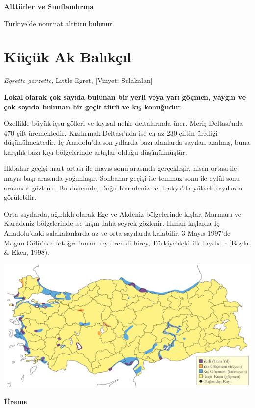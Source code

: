 \documentclass[
  a4paper,
  DIV=11,
  numbers=noendperiod]{scrreprt}
\begin{document}
\textbf{Alttürler ve Sınıflandırma}

Türkiye'de nominat alttürü bulunur.

\section{Küçük Ak Balıkçıl}\label{kuxfcuxe7uxfck-ak-balux131kuxe7ux131l}

\emph{Egretta garzetta}, Little Egret, {[}Vinyet: Sulakalan{]}

\textbf{Lokal olarak çok sayıda bulunan bir yerli veya yarı göçmen,
yaygın ve çok sayıda bulunan bir geçit türü ve kış konuğudur.}

Özellikle büyük içsu gölleri ve kıyısal nehir deltalarında ürer. Meriç
Deltası'nda 470 çift üremektedir. Kızılırmak Deltası'nda ise en az 230
çiftin ürediği düşünülmektedir. İç Anadolu'da son yıllarda bazı
alanlarda sayıları azalmış, buna karşılık bazı kıyı bölgelerinde
artışlar olduğu düşünülmüştür.

İlkbahar geçişi mart ortası ile mayıs sonu arasında gerçekleşir, nisan
ortası ile mayıs başı arasında yoğunlaşır. Sonbahar geçişi ise temmuz
sonu ile eylül sonu arasında gözlenir. Bu dönemde, Doğu Karadeniz ve
Trakya'da yüksek sayılarda görülebilir.

Orta sayılarda, ağırlıklı olarak Ege ve Akdeniz bölgelerinde kışlar.
Marmara ve Karadeniz bölgelerinde ise kışın daha seyrek gözlenir. Ilıman
kışlarda İç Anadolu'daki sulakalanlarda az ve orta sayılarda kalabilir.
3 Mayıs 1997'de Mogan Gölü'nde fotoğraflanan koyu renkli birey,
Türkiye'deki ilk kaydıdır (Boyla \& Eken, 1998).

\includegraphics{images/harita_Page_072.png}

\textbf{Üreme}
\end{document}
